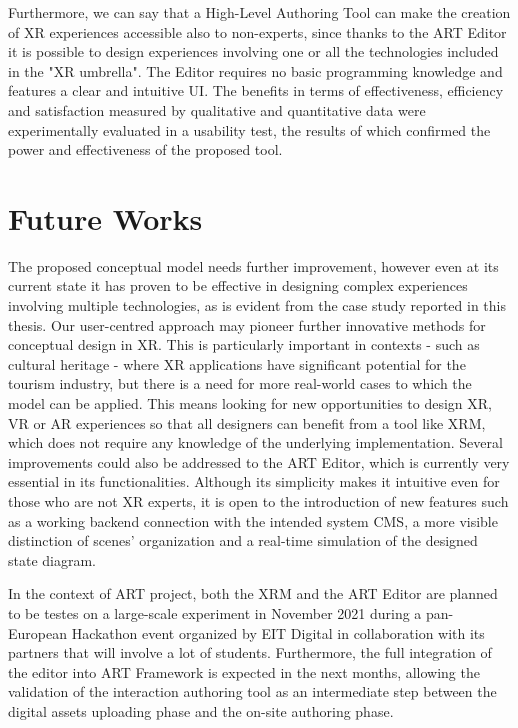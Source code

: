 Furthermore, we can say that a High-Level Authoring Tool can make the creation of XR experiences accessible also to non-experts, since thanks to the ART Editor it is possible to design experiences involving one or all the technologies included in the "XR umbrella". The Editor requires no basic programming knowledge and features a clear and intuitive UI.
The benefits in terms of effectiveness, efficiency and satisfaction measured by qualitative and quantitative data were experimentally evaluated in a usability test, the results of which confirmed the power and effectiveness of the proposed tool.

\clearpage
\section{Future Works}
\label{sec:future-works}
The proposed conceptual model needs further improvement, however even at its current state it has proven to be effective in designing complex experiences involving multiple technologies, as is evident from the case study reported in this thesis. Our user-centred approach may pioneer further innovative methods for conceptual design in XR. 
This is particularly important in contexts - such as cultural heritage - where XR applications have significant potential for the tourism industry, but there is a need for more real-world cases to which the model can be applied. This means looking for new opportunities to design XR, VR or AR experiences so that all designers can benefit from a tool like XRM, which does not require any knowledge of the underlying implementation. 
Several improvements could also be addressed to the ART Editor, which is currently very essential in its functionalities. Although its simplicity makes it intuitive even for those who are not XR experts, it is open to the introduction of new features such as a working backend connection with the intended system CMS, a more visible distinction of scenes' organization and a real-time simulation of the designed state diagram.

In the context of ART project, both the XRM and the ART Editor are planned to be testes on a large-scale experiment in November 2021 during a pan-European Hackathon event organized by EIT Digital in collaboration with its partners that will involve a lot of students. Furthermore, the full integration of the editor into ART Framework is expected in the next months, allowing the validation of the interaction authoring tool as an intermediate step between the digital assets uploading phase and the on-site authoring phase.
